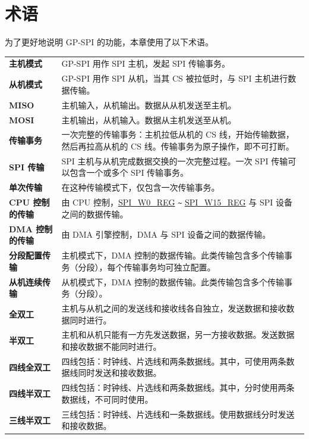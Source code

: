 \section{术语}

为了更好地说明 GP-SPI 的功能，本章使用了以下术语。 

\begin{longtable}[c]{ R{4cm} p{10cm} }

\textbf{主机模式}     & GP-SPI 用作 SPI 主机，发起 SPI 传输事务。\\ 
\textbf{从机模式}      & GP-SPI 用作 SPI 从机，当其 CS 被拉低时，与 SPI 主机进行数据传输。\\
\textbf{MISO}       & 主机输入，从机输出。数据从从机发送至主机。\\
\textbf{MOSI}  & 主机输出，从机输入。数据从主机发送至从机。\\ 
\textbf{传输事务} & 一次完整的传输事务：主机拉低从机的 CS 线，开始传输数据，然后再拉高从机的 CS 线。传输事务为原子操作，即不可打断。\\
\textbf{SPI 传输} & SPI 主机与从机完成数据交换的一次完整过程。一次 SPI 传输可以包含一个或多个 SPI 传输事务。\\
\textbf{单次传输} & 在这种传输模式下，仅包含一次传输事务。\\
\textbf{CPU 控制的传输}& 由 CPU 控制，\hyperref[regdesc:SPIW0REG]{SPI\_W0\_REG} \verb+~+ \hyperref[regdesc:SPIW15REG]{SPI\_W15\_REG} 与 SPI 设备之间的数据传输。\\
\textbf{DMA 控制的传输}& 由 DMA 引擎控制，DMA 与 SPI 设备之间的数据传输。\\
\textbf{分段配置传输}& 主机模式下，DMA 控制的数据传输。此类传输包含多个传输事务（分段），每个传输事务均可独立配置。\\
\textbf{从机连续传输} & 从机模式下，DMA 控制的数据传输。此类传输包含多个传输事务（分段）。\\
\textbf{全双工} & 主机与从机之间的发送线和接收线各自独立，发送数据和接收数据同时进行。\\
\textbf{半双工} & 主机和从机只能有一方先发送数据，另一方接收数据。发送数据和接收数据不能同时进行。\\
\textbf{四线全双工} & 四线包括：时钟线、片选线和两条数据线。其中，可使用两条数据线同时发送和接收数据。\\
\textbf{四线半双工} & 四线包括：时钟线、片选线和两条数据线。其中，分时使用两条数据线，不可同时使用。\\
\textbf{三线半双工} & 三线包括：时钟线、片选线和一条数据线。使用数据线分时发送和接收数据。\\

\end{longtable}
